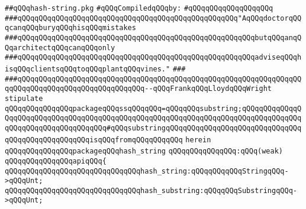 \label{src/lib/src/hash-string.pkg}
\verb|##qQQqhash-string.pkg|\newline
\newline
\verb|#qQQqCompiledqQQqby:|\newline
\verb|#qQQqqQQqqQQqqQQqqQQq|\newline
\newline
\newline
\newline
\verb|###qQQqqQQqqQQqqQQqqQQqqQQqqQQqqQQqqQQqqQQqqQQqqQQqqQQq"AqQQqdoctorqQQqcanqQQqburyqQQqhisqQQqmistakes|\newline
\verb|###qQQqqQQqqQQqqQQqqQQqqQQqqQQqqQQqqQQqqQQqqQQqqQQqqQQqqQQqbutqQQqanqQQqarchitectqQQqcanqQQqonly|\newline
\verb|###qQQqqQQqqQQqqQQqqQQqqQQqqQQqqQQqqQQqqQQqqQQqqQQqqQQqqQQqadviseqQQqhisqQQqclientsqQQqtoqQQqplantqQQqvines."|\newline
\verb|###|\newline
\verb|###qQQqqQQqqQQqqQQqqQQqqQQqqQQqqQQqqQQqqQQqqQQqqQQqqQQqqQQqqQQqqQQqqQQqqQQqqQQqqQQqqQQqqQQqqQQqqQQqqQQq--qQQqFrankqQQqLloydqQQqWright|\newline
\newline
\newline
\newline
\verb|stipulate|\newline
\verb|qQQqqQQqqQQqqQQqpackageqQQqssqQQqqQQq=qQQqqQQqsubstring;qQQqqQQqqQQqqQQqqQQqqQQqqQQqqQQqqQQqqQQqqQQqqQQqqQQqqQQqqQQqqQQqqQQqqQQqqQQqqQQqqQQqqQQqqQQqqQQqqQQqqQQqqQQq#qQQqsubstringqQQqqQQqqQQqqQQqqQQqqQQqqQQqqQQqqQQqqQQqqQQqqQQqqQQqisqQQqfromqQQqqQQqqQQq|\newline
\verb|herein|\newline
\newline
\verb|qQQqqQQqqQQqqQQqpackageqQQqhash_string|\newline
\verb|qQQqqQQqqQQqqQQq:qQQq(weak)|\newline
\verb|qQQqqQQqqQQqqQQqapiqQQq{|\newline
\newline
\verb|qQQqqQQqqQQqqQQqqQQqqQQqqQQqqQQqhash_string:qQQqqQQqqQQqStringqQQq->qQQqUnt;|\newline
\newline
\verb|qQQqqQQqqQQqqQQqqQQqqQQqqQQqqQQqhash_substring:qQQqqQQqSubstringqQQq->qQQqUnt;|\newline
\newline
